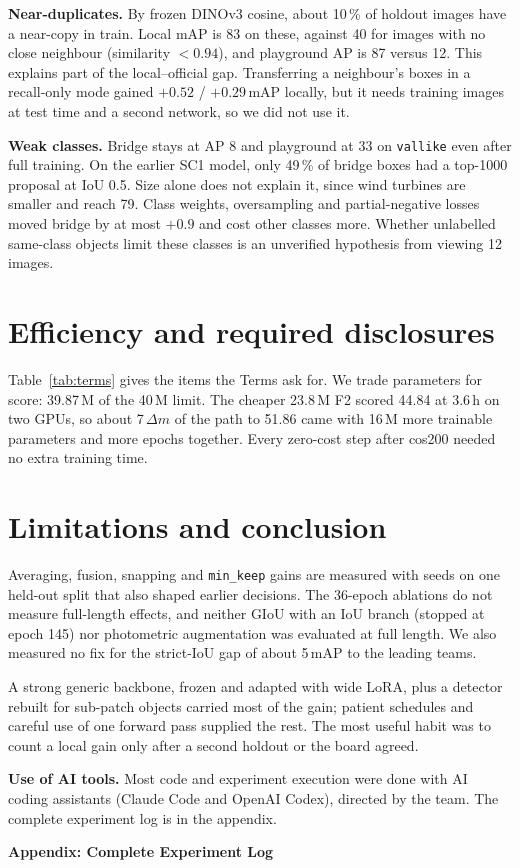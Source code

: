 \documentclass[10pt,twocolumn,letterpaper]{article}
\newcommand{\dm}{\ensuremath{\Delta m}}
\begin{document}
\textbf{Near-duplicates.} By frozen DINOv3 cosine, about 10\,\% of holdout images have a near-copy in train. Local mAP is 83 on these, against 40 for images with no close neighbour (similarity ${<}0.94$), and playground AP is 87 versus 12. This explains part of the local--official gap. Transferring a neighbour's boxes in a recall-only mode gained $+0.52$ / $+0.29$\,mAP locally, but it needs training images at test time and a second network, so we did not use it.

\textbf{Weak classes.} Bridge stays at AP 8 and playground at 33 on \texttt{vallike} even after full training. On the earlier SC1 model, only 49\,\% of bridge boxes had a top-1000 proposal at IoU 0.5. Size alone does not explain it, since wind turbines are smaller and reach 79. Class weights, oversampling and partial-negative losses moved bridge by at most $+0.9$ and cost other classes more. Whether unlabelled same-class objects limit these classes is an unverified hypothesis from viewing 12 images.

\section{Efficiency and required disclosures}
\label{sec:terms}
Table~\ref{tab:terms} gives the items the Terms ask for. We trade parameters for score: 39.87\,M of the 40\,M limit. The cheaper 23.8\,M F2 scored 44.84 at 3.6\,h on two GPUs, so about 7\,\dm{} of the path to 51.86 came with 16\,M more trainable parameters and more epochs together. Every zero-cost step after cos200 needed no extra training time.



\section{Limitations and conclusion}
Averaging, fusion, snapping and \texttt{min\_keep} gains are measured with seeds on one held-out split that also shaped earlier decisions. The 36-epoch ablations do not measure full-length effects, and neither GIoU with an IoU branch (stopped at epoch 145) nor photometric augmentation was evaluated at full length. We also measured no fix for the strict-IoU gap of about 5\,mAP to the leading teams.

A strong generic backbone, frozen and adapted with wide LoRA, plus a detector rebuilt for sub-patch objects carried most of the gain; patient schedules and careful use of one forward pass supplied the rest. The most useful habit was to count a local gain only after a second holdout or the board agreed.

\medskip\noindent\textbf{Use of AI tools.} Most code and experiment execution were done with AI coding assistants (Claude Code and OpenAI Codex), directed by the team. The complete experiment log is in the appendix.

{\small


}

\clearpage
\onecolumn
\appendix
\begin{center}{\Large\bfseries Appendix: Complete Experiment Log}\end{center}
\tableofcontents
\clearpage

\end{document}
